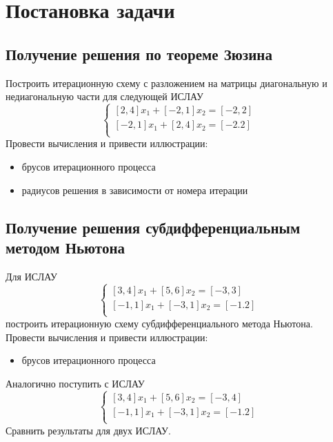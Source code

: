 \section{Постановка задачи}
\subsection{Получение решения по теореме Зюзина}
Построить итерационную схему с разложением на матрицы диагональную и недиагональную части для следующей ИСЛАУ
\begin{equation*}
 \begin{cases}
   [2,4]x_1+[-2,1]x_2 = [-2, 2]\\
   [-2, 1]x_1+[2, 4]x_2 = [-2. 2]\\
 \end{cases}
\end{equation*}
Провести вычисления и привести иллюстрации:
\begin{itemize}
    \item брусов итерационного процесса
    \item радиусов решения в зависимости от номера итерации
\end{itemize}
\subsection{Получение решения субдифференциальным методом Ньютона}
Для ИСЛАУ
\begin{equation} \label{System1}
 \begin{cases}
   [3,4]x_1+[5,6]x_2 = [-3, 3]\\
   [-1, 1]x_1+[-3, 1]x_2 = [-1. 2]\\
 \end{cases}
\end{equation}
построить итерационную схему субдифференциального метода Ньютона.\\
Провести вычисления и привести иллюстрации:
\begin{itemize}
    \item брусов итерационного процесса
\end{itemize}
Аналогично поступить с ИСЛАУ
\begin{equation} \label{System2}
 \begin{cases}
   [3,4]x_1+[5,6]x_2 = [-3, 4]\\
   [-1, 1]x_1+[-3, 1]x_2 = [-1. 2]\\
 \end{cases}
\end{equation}
Сравнить результаты для двух ИСЛАУ.